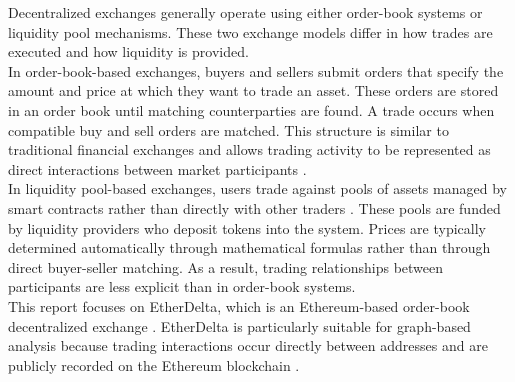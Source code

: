 \documentclass[language=english,thesis=bachelor,nosecondtitle,faculty=cb,onesided,13pt]{hsmw-thesis}
\begin{document}
Decentralized exchanges generally operate using either order-book systems or liquidity pool mechanisms. These two exchange models differ in how trades are executed and how liquidity is provided.\\
In order-book-based exchanges, buyers and sellers submit orders that specify the amount and price at which they want to trade an asset. These orders are stored in an order book until matching counterparties are found. A trade occurs when compatible buy and sell orders are matched. This structure is similar to traditional financial exchanges and allows trading activity to be represented as direct interactions between market participants \cite{lin2019deconstructing}.\\
In liquidity pool-based exchanges, users trade against pools of assets managed by smart contracts rather than directly with other traders \cite{adams2020uniswap}. These pools are funded by liquidity providers who deposit tokens into the system. Prices are typically determined automatically through mathematical formulas rather than through direct buyer-seller matching. As a result, trading relationships between participants are less explicit than in order-book systems.\\
This report focuses on EtherDelta, which is an Ethereum-based order-book decentralized exchange \cite{victor2021detecting}. EtherDelta is particularly suitable for graph-based analysis because trading interactions occur directly between addresses and are publicly recorded on the Ethereum blockchain \cite{victor2021detecting}.
\end{document}
